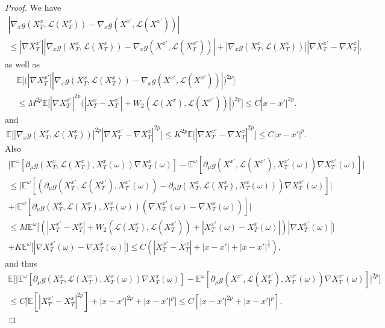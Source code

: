 \documentclass[12,english]{amsart}
\theoremstyle{plain}
\theoremstyle{definition}
\theoremstyle{plain}
\theoremstyle{plain}
\theoremstyle{remark}
\newcommand{\E}{\mathbb E}
\newcommand{\cL}{\mathcal L}
\newcommand{\om}{\omega}
\begin{document}
\begin{proof}
  We have
  \begin{multline*}
    |\nabla_xg(X^x_T,\cL(X^x_T))-\nabla_xg(X^{x'},\cL(X^{x'}))|\\
    \le |\nabla X^{x'}_T||\nabla_xg(X^x_T,\cL(X^x_T))-\nabla_xg(X^{x'},\cL(X^{x'}_T))|+
    |\nabla_xg(X^x_T,\cL(X^x_T))||\nabla X^{x'}_T-\nabla X^x_T|,
  \end{multline*}
  as well as
  \begin{multline*}
   \E\Big[\big( |\nabla
     X^{x'}_T||\nabla_xg(X^x_T,\cL(X^x_T))-\nabla_xg(X^{x'},\cL(X^{x'}))|\big)^{2p}\Big]\\\le
     M^{2p}\E\Big[ |\nabla
       X^{x'}_T|^{2p}\big(|X^x_T-X^{x'}_T|+W_2(\cL(X^x),\cL(X^{x'}))|\big)^{2p}\Big]\le C|x-x'|^{2p}.
     \end{multline*}
    and
   \[\E\Big[ |\nabla_xg(X^x_T,\cL(X^x_T))|^{2p}|\nabla X^{x'}_T-\nabla X^x_T|^{2p}\Big]
     \le K^{2p}\E\big[|\nabla X^{x'}_T-\nabla X^x_T|^{2p}\big]\le C|x-x'|^p.\]
Also
   \begin{multline*}
     \big|\E^\om[\partial_\mu g(X^x_T,\cL(X^x_T), X^x_T(\om))\nabla X^x_T(\om)]
  -\E^\om[\partial_\mu g(X^{x'},\cL(X^{x'}), X^{x'}_T(\om)) \nabla X^{x'}_T(\om)]\big|\\\le
 \big|\E^\om[(\partial_\mu g(X^{x'}_T,\cL(X^{x'}_T), X^{x'}_T(\om))
  -\partial_\mu g(X^x_T,\cL(X^x_T), X^x_T(\om)))\nabla X^{x'}_T(\om)]\big|\\+
  \big|\E^\om[\partial_\mu g(X^x_T,\cL(X^x_T), X^x_T(\om))(\nabla X^{x'}_T(\om)
  -\nabla X^x_T(\om))]\big|\\
\le M\E^\om\big[(|X^{x'}_T-X^x_T|+W_2(\cL(X^x_T),\cL(X^{x'}_T))+|X^{x'}_T(\om)-X^x_T(\om)|) |\nabla X^{x'}_T(\om)|\big]\\
+K \E^\om\big[|\nabla X^{x'}_T(\om)-\nabla X^x_T(\om)|\big]\le C
(|X^{x'}_T-X^x_T|+|x-x'|+|x-x'|^\frac12),
\end{multline*}
and thus
\begin{multline*}
  \E\Big[\big|\E^\om[\partial_\mu g(X^x_T,\cL(X^x_T), X^x_T(\om))\nabla X^x_T(\om)]
  -\E^\om[\partial_\mu g(X^{x'},\cL(X^{x'}_T), X^{x'}_T(\om)) \nabla X^{x'}_T(\om)]\big|^{2p}\Big]\\\le
C\big[\E[|X^{x'}_T-X^x_T|^{2p}]+|x-x'|^{2p}+|x-x'|^p\big]\le C[|x-x'|^{2p}+|x-x'|^p].
\end{multline*}
\end{proof}
\end{document}
